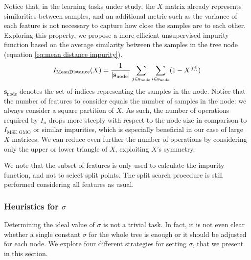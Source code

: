Notice that, in the learning tasks under study, the $X$ matrix already represents similarities between samples, and an additional metric such as the variance of each feature is not necessary to capture how close the samples are to each other. 
%
Exploring this property, we propose a more efficient unsupervised impurity function based on the average similarity between the samples in the tree node (equation \ref{eq:mean distance impurity}).
%
\begin{equation}
    I_\text{MeanDistance}(X) = \frac{1}{|\mathbf{s}_\text{node}|}
        \sum_{j \in \mathbf{s}_\text{node}}
        \sum_{i \in \mathbf{s}_\text{node}} (1 - X^{[ij]})
    \label{eq:mean distance impurity}
\end{equation}
%
$\mathbf{s}_\text{node}$ denotes the set of indices representing the samples in the node.
Notice that the number of features to consider equals the number of samples in the node: we always consider a square partition of $X$.
As such, the number of operations required by $I_u$ drops more steeply with respect to the node size in comparison to $I_\text{MSE GMO}$ or similar impurities, 
which is especially beneficial in our case of large $X$ matrices. We can reduce even further the number of operations by considering only the upper or lower triangle of $X$, exploiting $X$'s symmetry.

We note that the subset of features is only used to calculate the impurity function, and not to select split points. The split search procedure is still performed considering all features as usual.



\subsubsection{Heuristics for $\sigma$}
\label{sec:sigma heuristics}

Determining the ideal value of $\sigma$ is not a trivial task. In fact, it is not even clear whether a single constant $\sigma$ for the whole tree is enough or it should be adjusted for each node. We explore four different strategies for setting $\sigma$, that we present in this section.


